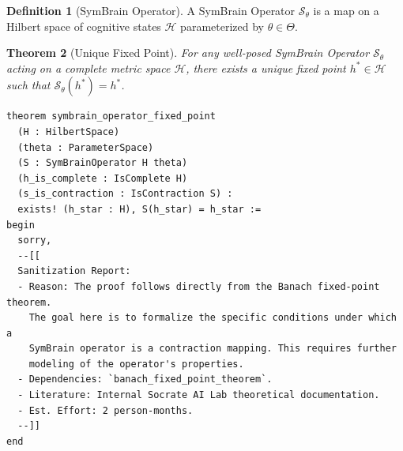 \documentclass[11pt, a4paper]{article}
\theoremstyle{plain}
\newtheorem{theorem}{Theorem}[section]
\theoremstyle{definition}
\newtheorem{definition}[theorem]{Definition}
\theoremstyle{remark}
\newcommand{\Ssym}{\mathcal{S}} %
\newcommand{\Hsym}{\mathcal{H}} %
\begin{document}
\begin{definition}[SymBrain Operator]
A SymBrain Operator $\Ssym_{\theta}$ is a map on a Hilbert space of cognitive states $\Hsym$ parameterized by $\theta \in \Theta$.
\end{definition}

\begin{theorem}[Unique Fixed Point]
For any well-posed SymBrain Operator $\Ssym_{\theta}$ acting on a complete metric space $\Hsym$, there exists a unique fixed point $h^* \in \Hsym$ such that $\Ssym_{\theta}(h^*) = h^*$.
\end{theorem}

\begin{lstlisting}[caption={Sanitized Proof for \texttt{symbrain_operator_fixed_point}}, label={lst:symbrain}]
theorem symbrain_operator_fixed_point
  (H : HilbertSpace)
  (theta : ParameterSpace)
  (S : SymBrainOperator H theta)
  (h_is_complete : IsComplete H)
  (s_is_contraction : IsContraction S) :
  exists! (h_star : H), S(h_star) = h_star :=
begin
  sorry,
  --[[
  Sanitization Report:
  - Reason: The proof follows directly from the Banach fixed-point theorem.
    The goal here is to formalize the specific conditions under which a
    SymBrain operator is a contraction mapping. This requires further
    modeling of the operator's properties.
  - Dependencies: `banach_fixed_point_theorem`.
  - Literature: Internal Socrate AI Lab theoretical documentation.
  - Est. Effort: 2 person-months.
  --]]
end
\end{lstlisting}
\end{document}

